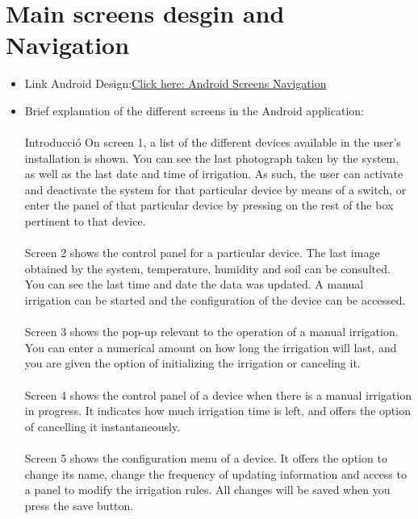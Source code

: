 \documentclass[11pt,a4paper]{article}
\begin{document}
\section{Main screens desgin and Navigation}
\begin{itemize}
\item Link Android Design:\newline\newline \textcolor{blue}{\href{https://drive.google.com/file/d/1GWvJHmUxLQVg-ns894TZreQi0Cy9rv79/view?usp=sharing}{Click here: Android Screens Navigation}}

\item Brief explanation of the different screens in the Android application: 
\\ \\Introducció
On screen 1, a list of the different devices available in the user's installation is shown. You can see the last photograph taken by the system, as well as the last date and time of irrigation. As such, the user can activate and deactivate the system for that particular device by means of a switch, or enter the panel of that particular device by pressing on the rest of the box pertinent to that device. 
\\ \\
Screen 2 shows the control panel for a particular device. The last image obtained by the system, temperature, humidity and soil can be consulted. 
You can see the last time and date the data was updated. A manual irrigation can be started and the configuration of the device can be accessed.
\\ \\
Screen 3 shows the pop-up relevant to the operation of a manual irrigation. You can enter a numerical amount on how long the irrigation will last, and you are given the option of initializing the irrigation or canceling it.
\\ \\
Screen 4 shows the control panel of a device when there is a manual irrigation in progress. It indicates how much irrigation time is left, and offers the option of cancelling it instantaneously. 
\\ \\
Screen 5 shows the configuration menu of a device. It offers the option to change its name, change the frequency of updating information and access to a panel to modify the irrigation rules. All changes will be saved when you press the save button. 
\\ \\

\end{itemize}
\end{document}
